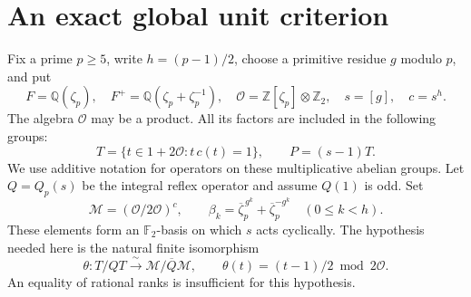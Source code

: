 \section{An exact global unit criterion}
\label{sec:cm-global-unit-criterion}

Fix a prime \(p\geq5\), write \(h=(p-1)/2\), choose a primitive
residue \(g\) modulo \(p\), and put
\[
 F=\mathbb Q(\zeta_p),\quad F^+=\mathbb Q(\zeta_p+\zeta_p^{-1}),
 \quad \mathcal O=\mathbb Z[\zeta_p]\otimes\mathbb Z_2,\quad
 s=[g],\quad c=s^h.
\]
The algebra \(\mathcal O\) may be a product. All its factors are
included in the following groups:
\[
 T=\{t\in1+2\mathcal O:t\,c(t)=1\},\qquad P=(s-1)T.
\]
We use additive notation for operators on these multiplicative
abelian groups. Let \(Q=Q_p(s)\) be the integral reflex operator and
assume \(Q(1)\) is odd. Set
\[
 \mathscr M=(\mathcal O/2\mathcal O)^c,\qquad
 \beta_k=\overline\zeta_p^{\,g^k}+
                \overline\zeta_p^{-g^k}\quad(0\leq k<h).
\]
These elements form an \(\mathbb F_2\)-basis on which \(s\) acts cyclically. The hypothesis
needed here is the natural finite isomorphism
\begin{equation}
 \theta:T/QT\xrightarrow{\ \sim\ }
               \mathscr M/\overline Q\mathscr M,\qquad
 \theta(t)=(t-1)/2\bmod2\mathcal O.
 \label{eq:uniform-natural-layer}
\end{equation}
An equality of rational ranks is insufficient for this hypothesis.

